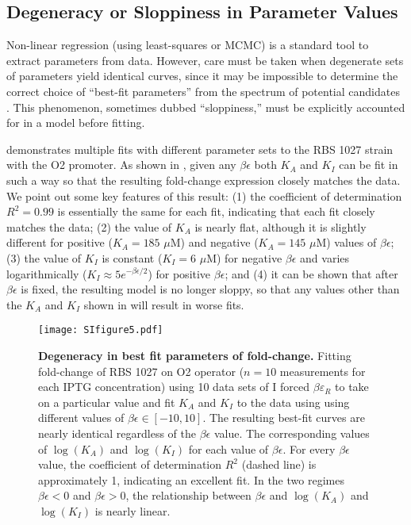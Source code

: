 \subsection{Degeneracy or Sloppiness in Parameter Values}

Non-linear regression (using least-squares or MCMC) is a standard tool to
extract parameters from data. However, care must be taken when
degenerate sets of parameters yield identical curves, since it may be impossible
to determine the correct choice of ``best-fit parameters'' from the spectrum of
potential candidates \cite{Transtrum2015}. This phenomenon, sometimes dubbed
``sloppiness,'' must be explicitly accounted for in a model before fitting.

\fref[SIfig5] demonstrates multiple fits with different parameter sets
to the RBS 1027 strain with the O2 promoter. As shown in
\fref[SIfig5], given any $\beta \epsilon$ both $K_A$ and $K_I$ can be
fit in such a way so that the resulting fold-change expression closely matches
the data. We point out some key features of this result: (1) the coefficient of
determination $R^2 = 0.99$ is essentially the same for each fit, indicating that
each fit closely matches the data; (2) the value of $K_A$ is nearly flat,
although it is slightly different for positive ($K_A = 185\,\,\mu\text{M}$) and
negative ($K_A = 145\,\,\mu\text{M}$) values of $\beta \epsilon$; (3) the value
of $K_I$ is constant ($K_I = 6\,\,\mu\text{M}$) for negative $\beta \epsilon$
and varies logarithmically ($K_I \approx 5 e^{-\beta \epsilon/2}$) for positive
$\beta \epsilon$; and (4) it can be shown that after $\beta \epsilon$ is fixed,
the resulting model is no longer sloppy, so that any values other than the $K_A$
and $K_I$ shown in \fref[SIfig5] will result in worse fits.

\begin{figure}[h]
	\centering \texttt{[image: SIfigure5.pdf]} \caption{{\bf Degeneracy in best fit
			parameters of fold-change.}  Fitting fold-change of RBS 1027 on
		O2 operator ($n=10$ measurements for each IPTG concentration) using 10 data
		sets of I forced $\beta \varepsilon_R$ to take on a particular value and fit
		$K_A$ and $K_I$ to the data using \eref[SIFullFoldChangeExpression] using
		different values of $\beta \epsilon \in [-10,10]$. The resulting best-fit
		curves are nearly identical regardless of the $\beta \epsilon$ value.
		 The corresponding values of $\log\left( K_A \right)$ and $\log
		\left( K_I \right)$ for each value of $\beta \epsilon$. For every $\beta
		\epsilon$ value, the coefficient of determination $R^2$ (dashed line) is
		approximately 1, indicating an excellent fit. In the two regimes $\beta
		\epsilon < 0$ and $\beta \epsilon > 0$, the relationship between $\beta
		\epsilon$ and $\log\left( K_A \right)$ and $\log \left( K_I \right)$ is nearly
		linear. }
	\label{SIfig5}
\end{figure}

